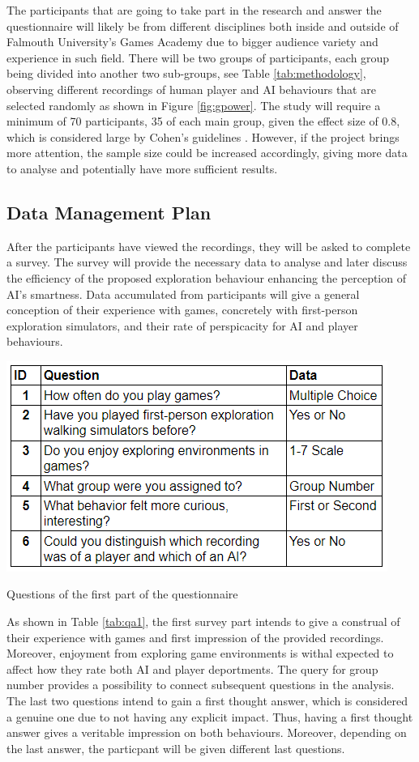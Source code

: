 \documentclass[journal]{IEEEtran}
\begin{document}
The participants that are going to take part in the research and answer the questionnaire will likely be from different disciplines both inside and outside of Falmouth University's Games Academy due to bigger audience variety and experience in such field. There will be two groups of participants, each group being divided into another two sub-groups, see Table \ref{tab:methodology}, observing different recordings of human player and AI behaviours that are selected randomly as shown in Figure \ref{fig:gpower}. The study will require a minimum of 70 participants, 35 of each main group, given the effect size of 0.8, which is considered large by Cohen's guidelines \cite{cohen1992power}. However, if the project brings more attention, the sample size could be increased accordingly, giving more data to analyse and potentially have more sufficient results. %

\subsection{Data Management Plan} \label{data} %
After the participants have viewed the recordings, they will be asked to complete a survey. The survey will provide the necessary data to analyse and later discuss the efficiency of the proposed exploration behaviour enhancing the perception of AI's smartness. Data accumulated from participants will give a general conception of their experience with games, concretely with first-person exploration simulators, and their rate of perspicacity for AI and player behaviours. 
\begin{table}
	\includegraphics[width=\linewidth]{Images/QA1.PNG}
	\caption{Questions of the first part of the questionnaire}
	\label{tab:qa1}
\end{table}
As shown in Table \ref{tab:qa1}, the first survey part intends to give a construal of their experience with games and first impression of the provided recordings. Moreover, enjoyment from exploring game environments is withal expected to affect how they rate both AI and player deportments. The query for group number provides a possibility to connect subsequent questions in the analysis. The last two questions intend to gain a first thought answer, which is considered a genuine one \cite{huntsinger2009first} due to not having any explicit impact. Thus, having a first thought answer gives a veritable impression on both behaviours. Moreover, depending on the last answer, the particpant will be given different last questions. 
\end{document}
